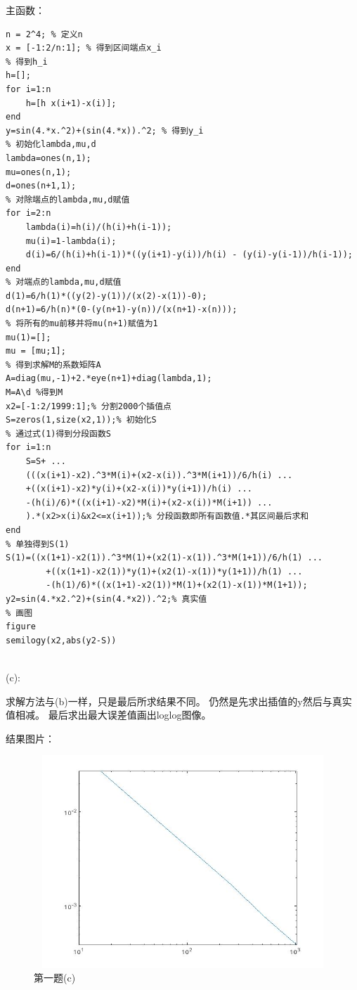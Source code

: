 \documentclass[12pt,a4paper,utf8]{ctexart}
\begin{document}
\begin{enumerate}
主函数：
\begin{lstlisting}[frame=single]
n = 2^4; % 定义n
x = [-1:2/n:1]; % 得到区间端点x_i
% 得到h_i
h=[];
for i=1:n
    h=[h x(i+1)-x(i)];
end 
y=sin(4.*x.^2)+(sin(4.*x)).^2; % 得到y_i
% 初始化lambda,mu,d
lambda=ones(n,1);
mu=ones(n,1);
d=ones(n+1,1);
% 对除端点的lambda,mu,d赋值
for i=2:n
    lambda(i)=h(i)/(h(i)+h(i-1));
    mu(i)=1-lambda(i);
    d(i)=6/(h(i)+h(i-1))*((y(i+1)-y(i))/h(i) - (y(i)-y(i-1))/h(i-1));
end
% 对端点的lambda,mu,d赋值
d(1)=6/h(1)*((y(2)-y(1))/(x(2)-x(1))-0);
d(n+1)=6/h(n)*(0-(y(n+1)-y(n))/(x(n+1)-x(n)));
% 将所有的mu前移并将mu(n+1)赋值为1
mu(1)=[];
mu = [mu;1];
% 得到求解M的系数矩阵A
A=diag(mu,-1)+2.*eye(n+1)+diag(lambda,1);
M=A\d %得到M
x2=[-1:2/1999:1];% 分割2000个插值点
S=zeros(1,size(x2,1));% 初始化S
% 通过式(1)得到分段函数S
for i=1:n
    S=S+ ...
    (((x(i+1)-x2).^3*M(i)+(x2-x(i)).^3*M(i+1))/6/h(i) ...
    +((x(i+1)-x2)*y(i)+(x2-x(i))*y(i+1))/h(i) ...
    -(h(i)/6)*((x(i+1)-x2)*M(i)+(x2-x(i))*M(i+1)) ...
    ).*(x2>x(i)&x2<=x(i+1));% 分段函数即所有函数值.*其区间最后求和
end
% 单独得到S(1)
S(1)=((x(1+1)-x2(1)).^3*M(1)+(x2(1)-x(1)).^3*M(1+1))/6/h(1) ...
        +((x(1+1)-x2(1))*y(1)+(x2(1)-x(1))*y(1+1))/h(1) ...
        -(h(1)/6)*((x(1+1)-x2(1))*M(1)+(x2(1)-x(1))*M(1+1));
y2=sin(4.*x2.^2)+(sin(4.*x2)).^2;% 真实值
% 画图
figure
semilogy(x2,abs(y2-S))
   
\end{lstlisting}

(c):

求解方法与(b)一样，只是最后所求结果不同。
仍然是先求出插值的y然后与真实值相减。
最后求出最大误差值画出loglog图像。

\newpage
结果图片：
\begin{figure}[htbp]
   \centering
   \includegraphics[width=15cm,height=8cm]{ex1c.jpg}
   \caption{第一题(c)}
\end{figure}




\end{enumerate}
\end{document}
